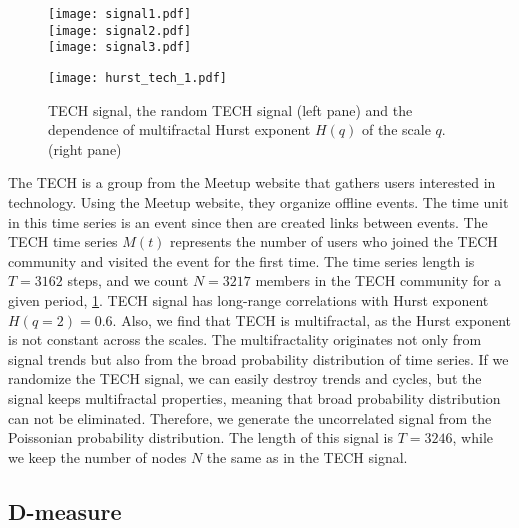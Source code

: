 \begin{figure}[ht]
	\centering
	\begin{minipage}[b]{0.4\textwidth}
		\centering
		\texttt{[image: signal1.pdf]}\\
		\texttt{[image: signal2.pdf]}\\
		\texttt{[image: signal3.pdf]}
		
	\end{minipage}
	\begin{minipage}[b]{0.45\textwidth}
		\centering
		\texttt{[image: hurst\_tech\_1.pdf]}
		\vspace{1cm}
	\end{minipage}
	\caption[Properties of the TECH and Poisson signals.]{TECH signal, the random TECH signal (left pane) and the dependence of multifractal Hurst exponent $H(q)$ of the scale $q$. (right pane)}
	\label{fig:tech_signals}
\end{figure}

The TECH is a group from the Meetup website that gathers users interested in technology. Using the Meetup website, they organize offline events. The time unit in this time series is an event since then are created links between events. The TECH time series $M(t)$ represents the number of users who joined the TECH community and visited the event for the first time. The time series length is $T=3162$ steps, and we count $N=3217$ members in the TECH community for a given period, \ref{fig:tech_signals}. TECH signal has long-range correlations with Hurst exponent $H(q=2)=0.6$. Also, we find that TECH is multifractal, as the Hurst exponent is not constant across the scales. The multifractality originates not only from signal trends but also from the broad probability distribution of time series. If we randomize the TECH signal, we can easily destroy trends and cycles, but the signal keeps multifractal properties, meaning that broad probability distribution can not be eliminated. Therefore, we generate the uncorrelated signal from the Poissonian probability distribution. The length of this signal is  $T = 3246$, while we keep the number of nodes $N$ the same as in the TECH signal.


\subsection{D-measure}

